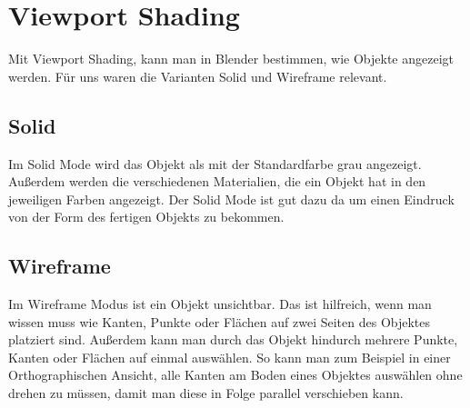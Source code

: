 \section{Viewport Shading}
Mit Viewport Shading, kann man in Blender bestimmen, wie Objekte angezeigt werden. Für uns waren die Varianten Solid und Wireframe relevant.

\subsection{Solid}
Im Solid Mode wird das Objekt als mit der Standardfarbe grau angezeigt. Außerdem werden die verschiedenen Materialien, die ein Objekt
hat in den jeweiligen Farben angezeigt. Der Solid Mode ist gut dazu da um einen Eindruck von der Form des fertigen Objekts zu bekommen.

\subsection{Wireframe}
Im Wireframe Modus ist ein Objekt unsichtbar. Das ist hilfreich, wenn man wissen muss wie Kanten, Punkte oder Flächen auf zwei Seiten des Objektes
platziert sind. Außerdem kann man durch das Objekt hindurch mehrere Punkte, Kanten oder Flächen auf einmal auswählen. So kann man zum Beispiel
in einer Orthographischen Ansicht, alle Kanten am Boden eines Objektes auswählen ohne drehen zu müssen, damit man diese in Folge parallel verschieben kann.

